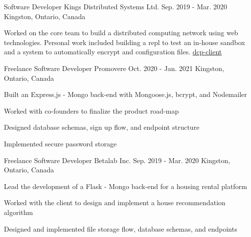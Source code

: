 

\begin{cventries}

  \cventry
    {Software Developer} %
    {Kings Distributed Systems Ltd.} %
    {Sep. 2019 - Mar. 2020} %
    {Kingston, Ontario, Canada} %
    {
      \begin{cvitems} %
        \item {Worked on the core team to build a distributed computing network using web technologies. Personal work included building a repl to test an in-house sandbox and a system to automatically encrypt and configuration files. \href{https://www.npmjs.com/package/dcp-client}{dcp-client}}
      \end{cvitems}
    }

  \cventry
    {Freelance Software Developer} %
    {Promovere} %
    {Oct. 2020 - Jan. 2021} %
    {Kingston, Ontario, Canada} %
    {
      \begin{cvitems} %
        \item {Built an Express.js - Mongo back-end with Mongoose.js, bcrypt, and Nodemailer}
        \item{Worked with co-founders to finalize the product road-map}
        \item{Designed database schemas, sign up flow, and endpoint structure}
        \item{Implemented secure password storage}
      \end{cvitems}
    }

  \cventry
    {Freelance Software Developer} %
    {Betalab Inc.} %
    {Sep. 2019 - Mar. 2020} %
    {Kingston, Ontario, Canada} %
    {
      \begin{cvitems} %
        \item {Lead the development of a Flask - Mongo back-end for a housing rental platform} %
        \item{Worked with the client to design and implement a house recommendation algorithm}
        \item{Designed and implemented file storage flow, database schemas, and endpoints}
      \end{cvitems}
    }


\end{cventries}
